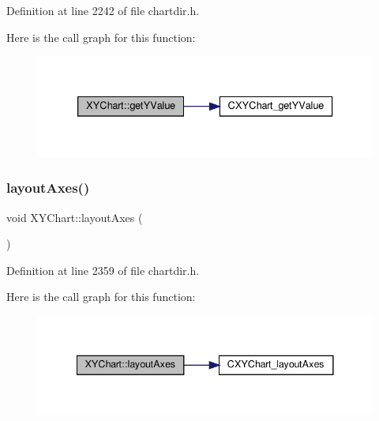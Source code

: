 Definition at line 2242 of file chartdir.\+h.

Here is the call graph for this function\+:
\nopagebreak
\begin{figure}[H]
\begin{center}
\leavevmode
\includegraphics[width=333pt]{class_x_y_chart_af777219a26001a954dce11c9ff737aca_cgraph}
\end{center}
\end{figure}
\mbox{\label{class_x_y_chart_a06c7c3e15a931c6e9611596a67dd87f6}} 
\subsubsection{\texorpdfstring{layout\+Axes()}{layoutAxes()}}
{\footnotesize\ttfamily void X\+Y\+Chart\+::layout\+Axes (\begin{DoxyParamCaption}{ }\end{DoxyParamCaption})\hspace{0.3cm}{\ttfamily [inline]}}



Definition at line 2359 of file chartdir.\+h.

Here is the call graph for this function\+:
\nopagebreak
\begin{figure}[H]
\begin{center}
\leavevmode
\includegraphics[width=341pt]{class_x_y_chart_a06c7c3e15a931c6e9611596a67dd87f6_cgraph}
\end{center}
\end{figure}
\mbox{\label{class_x_y_chart_a2d607d6dc0522d1f8547c72e007c538d}} 
